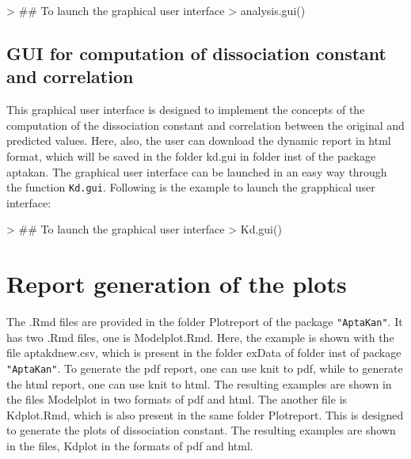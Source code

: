 \documentclass[11pt]{article}
\newcommand{\code}[1]{{\tt #1}}
\newcommand{\pkg}[1]{{\tt "#1"}}
\begin{document}
\begin{Schunk}
\begin{Sinput}
> ## To launch the graphical user interface
> analysis.gui()
\end{Sinput}
\end{Schunk}

\subsection{GUI for computation of dissociation constant and correlation}
This graphical user interface is designed to implement the concepts of the computation of the
dissociation constant and correlation between the original and predicted values. Here, also, the
user can download the dynamic report in html format, which will be saved in the folder kd.gui in
folder inst of the package aptakan. The graphical user interface can be launched in an easy way
through the function \code{Kd.gui}. Following is the example to launch the grapphical user interface:

\begin{Schunk}
\begin{Sinput}
> ## To launch the graphical user interface
> Kd.gui()
\end{Sinput}
\end{Schunk}


\section{Report generation of the plots}
The .Rmd files are provided in the folder Plotreport of the package \pkg{AptaKan}. It has two .Rmd files, one is Modelplot.Rmd. Here, the example is shown with the file aptakdnew.csv, which is present in the folder exData of folder inst of package \pkg{AptaKan}. To generate the pdf report, one can use knit to pdf, while to generate the html report, one can use knit to html. The resulting examples are shown in the files Modelplot in two formats of pdf and html. The another file is Kdplot.Rmd, which is also present in the same folder Plotreport. This is designed to generate the plots of dissociation constant. The resulting examples are shown in the files, Kdplot in the formats of pdf and html.

\end{document}
